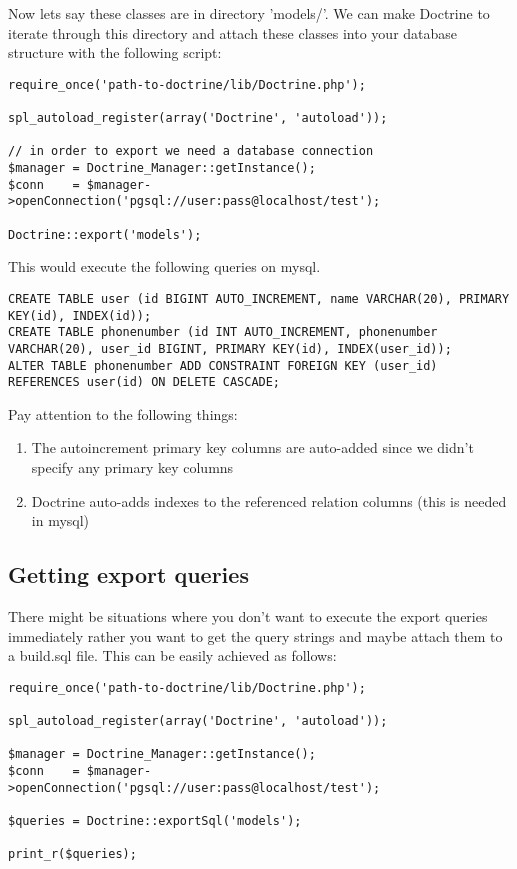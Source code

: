 \documentclass[11pt,a4paper]{report}
\begin{document}
Now lets say these classes are in directory 'models/'. We can make Doctrine to iterate through this directory and attach these classes into your database structure with the following script:

\begin{verbatim}
require_once('path-to-doctrine/lib/Doctrine.php');

spl_autoload_register(array('Doctrine', 'autoload'));

// in order to export we need a database connection
$manager = Doctrine_Manager::getInstance();
$conn    = $manager->openConnection('pgsql://user:pass@localhost/test');

Doctrine::export('models');
\end{verbatim}

This would execute the following queries on mysql.

\begin{verbatim}
CREATE TABLE user (id BIGINT AUTO_INCREMENT, name VARCHAR(20), PRIMARY KEY(id), INDEX(id));
CREATE TABLE phonenumber (id INT AUTO_INCREMENT, phonenumber VARCHAR(20), user_id BIGINT, PRIMARY KEY(id), INDEX(user_id));
ALTER TABLE phonenumber ADD CONSTRAINT FOREIGN KEY (user_id) REFERENCES user(id) ON DELETE CASCADE;
\end{verbatim}

Pay attention to the following things:

\renewcommand{\labelenumi}{\arabic{enumi}}
\begin{enumerate}
\item{The autoincrement primary key columns are auto-added since we didn't specify any primary key columns}
\item{Doctrine auto-adds indexes to the referenced relation columns (this is needed in mysql)}
\end{enumerate}
\subsection{Getting export queries}
There might be situations where you don't want to execute the export queries immediately rather you want to get the query strings and maybe attach them to a build.sql file. This can be easily achieved as follows:

\begin{verbatim}
require_once('path-to-doctrine/lib/Doctrine.php');

spl_autoload_register(array('Doctrine', 'autoload'));

$manager = Doctrine_Manager::getInstance();
$conn    = $manager->openConnection('pgsql://user:pass@localhost/test');

$queries = Doctrine::exportSql('models');

print_r($queries);
\end{verbatim}
\end{document}
